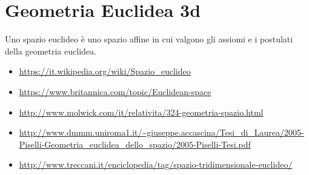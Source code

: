 \section{Geometria Euclidea 3d}
\begin{definizione}
Uno spazio euclideo è uno spazio affine in cui valgono gli assiomi e i postulati della geometria euclidea.
\end{definizione}


\begin{osservazione}
\begin{itemize}
 \item \url{https://it.wikipedia.org/wiki/Spazio_euclideo}
 \item \url{https://www.britannica.com/topic/Euclidean-space}
 \item \url{http://www.molwick.com/it/relativita/324-geometria-spazio.html}
 \item \url{http://www.dmmm.uniroma1.it/~giuseppe.accascina/Tesi_di_Laurea/2005-Piselli-Geometria_euclidea_dello_spazio/2005-Piselli-Tesi.pdf}
 \item \url{http://www.treccani.it/enciclopedia/tag/spazio-tridimensionale-euclideo/}
\end{itemize}
\end{osservazione}

